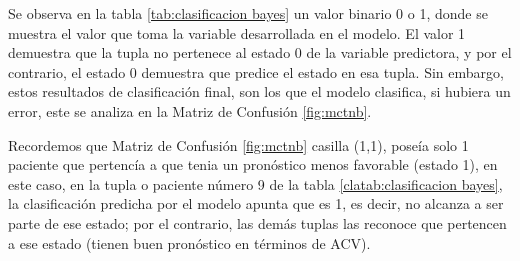     Se observa en la tabla \ref{tab:clasificacion bayes} un valor binario 0 o 1, donde se muestra el valor que toma la variable desarrollada en el modelo. El valor 1 demuestra que la tupla no pertenece al estado 0 de la variable predictora, y por el contrario, el estado 0 demuestra que predice el estado en esa tupla. Sin embargo, estos resultados de clasificación final, son los que el modelo clasifica, si hubiera un error, este se analiza en la Matriz de Confusión \ref{fig:mctnb}.
\par Recordemos que Matriz de Confusión \ref{fig:mctnb} casilla (1,1), poseía solo 1 paciente que pertencía a que tenia un pronóstico menos favorable (estado 1), en este caso, en la tupla o paciente número 9 de la tabla \ref{clatab:clasificacion bayes}, la clasificación predicha por el modelo apunta que es 1, es decir, no alcanza a ser parte de ese estado; por el contrario, las demás tuplas las reconoce que pertencen a ese estado (tienen buen pronóstico en términos de ACV).\\
    
    